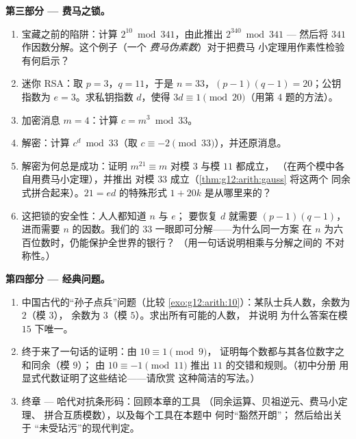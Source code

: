 \begin{problem}
\medskip
\noindent\textbf{第三部分 --- 费马之锁。}
\begin{enumerate}[resume]
  \item 宝藏之前的陷阱：计算
        $2^{10} \bmod 341$，由此推出 $2^{340} \bmod 341$ ---
        然后将 $341$ 作因数分解。这个例子（一个
        \emph{费马伪素数}）对于把费马
        小定理用作素性检验有何启示？
  \item 迷你 RSA：取 $p = 3$，$q = 11$，于是
        $n = 33$，$(p-1)(q-1) = 20$；公钥指数为
        $e = 3$。求私钥指数 $d$，使得
        $3d \equiv 1 \pmod{20}$（用第 4 题的方法）。
  \item 加密消息 $m = 4$：计算
        $c = m^3 \bmod 33$。
  \item 解密：计算 $c^d \bmod 33$（取
        $c \equiv -2 \pmod{33}$），并还原消息。
  \item 解密为何总是成功：证明
        $m^{21} \equiv m$ 对模 $3$ 与模 $11$ 都成立，
        （在两个模中各自用费马小定理），并推出
        对模 $33$ 成立（\cref{thm:g12:arith:gauss} 将这两个
        同余式拼合起来）。$21 = ed$ 的特殊形式
        $1 + 20k$ 是从哪里来的？
  \item 这把锁的安全性：人人都知道 $n$ 与 $e$；
        要恢复 $d$ 就需要 $(p-1)(q-1)$，进而需要
        $n$ 的因数。我们的 $33$ 一眼即可分解——为什么同一方案
        在 $n$ 为六百位数时，仍能保护全世界的银行？
        （用一句话说明相乘与分解之间的
        不对称性。）
\end{enumerate}

\medskip
\noindent\textbf{第四部分 --- 经典问题。}
\begin{enumerate}[resume]
  \item 中国古代的“孙子点兵”问题（比较
        \cref{exo:g12:arith:10}）：某队士兵人数，余数为 $2$（模 $3$），
        余数为 $3$（模 $5$）。求出所有可能的人数，
        并说明
        为什么答案在模 $15$ 下唯一。
  \item 终于来了一句话的证明：由 $10 \equiv 1 \pmod 9$，
        证明每个数都与其各位数字之和同余（模 $9$）；
        由 $10 \equiv -1 \pmod{11}$ 推出
        $11$ 的交错和规则。（初中分册
        用显式代数证明了这些结论——请欣赏
        这种简洁的写法。）
  \item 终章 --- 哈代对抗条形码：回顾本章的工具
        （同余运算、贝祖逆元、费马小定理、
        拼合互质模数），以及每个工具在本题中
        何时“豁然开朗”；
        然后给出关于
        “未受玷污”的现代判定。
\end{enumerate}
\end{problem}
